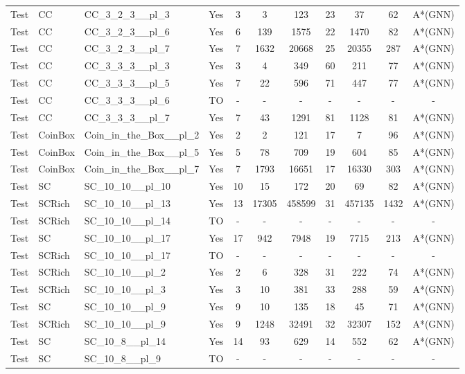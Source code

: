 \documentclass{article}
\begin{document}
\begin{tabular}{lllcccccccc}
Test & CC & CC\_3\_2\_3\_\_pl\_3 & Yes & 3 & 3 & 123 & 23 & 37 & 62 & A*(GNN) \\
Test & CC & CC\_3\_2\_3\_\_pl\_6 & Yes & 6 & 139 & 1575 & 22 & 1470 & 82 & A*(GNN) \\
Test & CC & CC\_3\_2\_3\_\_pl\_7 & Yes & 7 & 1632 & 20668 & 25 & 20355 & 287 & A*(GNN) \\
Test & CC & CC\_3\_3\_3\_\_pl\_3 & Yes & 3 & 4 & 349 & 60 & 211 & 77 & A*(GNN) \\
Test & CC & CC\_3\_3\_3\_\_pl\_5 & Yes & 7 & 22 & 596 & 71 & 447 & 77 & A*(GNN) \\
Test & CC & CC\_3\_3\_3\_\_pl\_6 & TO & - & - & - & - & - & - & - \\
Test & CC & CC\_3\_3\_3\_\_pl\_7 & Yes & 7 & 43 & 1291 & 81 & 1128 & 81 & A*(GNN) \\
Test & CoinBox & Coin\_in\_the\_Box\_\_pl\_2 & Yes & 2 & 2 & 121 & 17 & 7 & 96 & A*(GNN) \\
Test & CoinBox & Coin\_in\_the\_Box\_\_pl\_5 & Yes & 5 & 78 & 709 & 19 & 604 & 85 & A*(GNN) \\
Test & CoinBox & Coin\_in\_the\_Box\_\_pl\_7 & Yes & 7 & 1793 & 16651 & 17 & 16330 & 303 & A*(GNN) \\
Test & SC & SC\_10\_10\_\_pl\_10 & Yes & 10 & 15 & 172 & 20 & 69 & 82 & A*(GNN) \\
Test & SCRich & SC\_10\_10\_\_pl\_13 & Yes & 13 & 17305 & 458599 & 31 & 457135 & 1432 & A*(GNN) \\
Test & SCRich & SC\_10\_10\_\_pl\_14 & TO & - & - & - & - & - & - & - \\
Test & SC & SC\_10\_10\_\_pl\_17 & Yes & 17 & 942 & 7948 & 19 & 7715 & 213 & A*(GNN) \\
Test & SCRich & SC\_10\_10\_\_pl\_17 & TO & - & - & - & - & - & - & - \\
Test & SCRich & SC\_10\_10\_\_pl\_2 & Yes & 2 & 6 & 328 & 31 & 222 & 74 & A*(GNN) \\
Test & SCRich & SC\_10\_10\_\_pl\_3 & Yes & 3 & 10 & 381 & 33 & 288 & 59 & A*(GNN) \\
Test & SC & SC\_10\_10\_\_pl\_9 & Yes & 9 & 10 & 135 & 18 & 45 & 71 & A*(GNN) \\
Test & SCRich & SC\_10\_10\_\_pl\_9 & Yes & 9 & 1248 & 32491 & 32 & 32307 & 152 & A*(GNN) \\
Test & SC & SC\_10\_8\_\_pl\_14 & Yes & 14 & 93 & 629 & 14 & 552 & 62 & A*(GNN) \\
Test & SC & SC\_10\_8\_\_pl\_9 & TO & - & - & - & - & - & - & - \\

\end{tabular}
\end{document}
